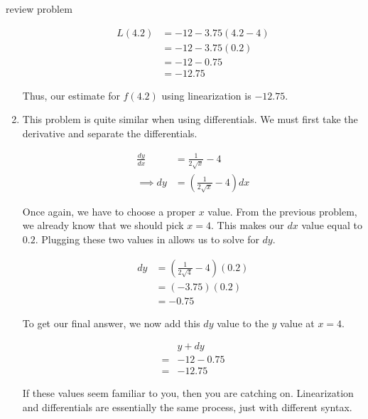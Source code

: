 \begin{examplebreak}{review problem}
\begin{enumerate}
        \begin{align*}
            L \left( 4.2 \right) &= -12 - 3.75 \left( 4.2 - 4 \right) \\
            &= -12 - 3.75 \left( 0.2 \right) \\
            &= -12 - 0.75 \\
            &= -12.75
        \end{align*}

        Thus, our estimate for \( f \left( 4.2 \right) \) using linearization is \( -12.75 \).

        \item This problem is quite similar when using differentials. We must first take the derivative and separate the differentials.

        \begin{align*}
            \frac{dy}{dx} &= \frac{1}{2 \sqrt{ x }} - 4 \\
            \implies dy &= \left( \frac{1}{2 \sqrt{ x }} - 4 \right) dx
        \end{align*}

        Once again, we have to choose a proper \( x \) value. From the previous problem, we already know that we should pick \( x = 4 \). This makes our \( dx \) value equal to \( 0.2 \). Plugging these two values in allows us to solve for \( dy \).

        \begin{align*}
            dy &= \left( \frac{1}{2 \sqrt{4}} - 4 \right) \left( 0.2 \right) \\
               &= \left( -3.75 \right) \left( 0.2 \right) \\
               &= -0.75
        \end{align*}

        To get our final answer, we now add this \( dy \) value to the \( y \) value at \( x = 4 \).

        \begin{align*}
            &y + dy \\
            = &-12 - 0.75 \\
            = &-12.75
        \end{align*}

        If these values seem familiar to you, then you are catching on. Linearization and differentials are essentially the same process, just with different syntax.
    \end{enumerate}
\end{examplebreak}

